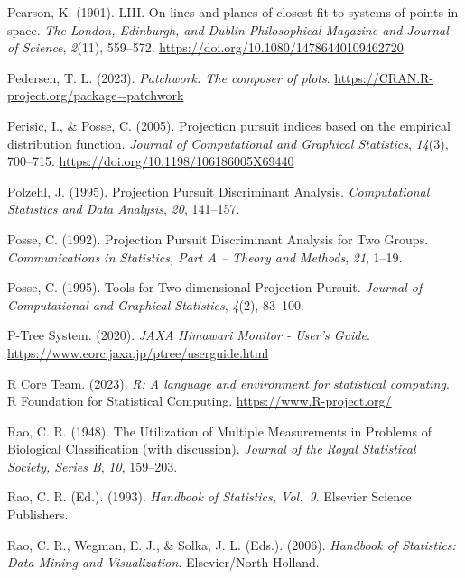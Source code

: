 \documentclass[
  letterpaper,
]{krantz}
\newlength{\cslhangindent}
\newlength{\cslentryspacingunit} %
\newenvironment{CSLReferences}[2] %
 {%
  \setlength{\parindent}{0pt}
  \ifodd #1
  \let\oldpar\par
  \def\par{\hangindent=\cslhangindent\oldpar}
  \fi
  \setlength{\parskip}{#2\cslentryspacingunit}
 }%
 {}
\begin{document}
\begin{CSLReferences}{1}{0}
\leavevmode{}%
Pearson, K. (1901). LIII. On lines and planes of closest fit to systems
of points in space. \emph{The London, Edinburgh, and Dublin
Philosophical Magazine and Journal of Science}, \emph{2}(11), 559--572.
\url{https://doi.org/10.1080/14786440109462720}

\leavevmode{}%
Pedersen, T. L. (2023). \emph{Patchwork: The composer of plots}.
\url{https://CRAN.R-project.org/package=patchwork}

\leavevmode{}%
Perisic, I., \& Posse, C. (2005). Projection pursuit indices based on
the empirical distribution function. \emph{Journal of Computational and
Graphical Statistics}, \emph{14}(3), 700--715.
\url{https://doi.org/10.1198/106186005X69440}

\leavevmode{}%
Polzehl, J. (1995). Projection {P}ursuit {D}iscriminant {A}nalysis.
\emph{Computational Statistics and Data Analysis}, \emph{20}, 141--157.

\leavevmode{}%
Posse, C. (1992). Projection {P}ursuit {D}iscriminant {A}nalysis for
{T}wo {G}roups. \emph{Communications in Statistics, Part A -- Theory and
Methods}, \emph{21}, 1--19.

\leavevmode{}%
Posse, C. (1995). Tools for {T}wo-dimensional {P}rojection {P}ursuit.
\emph{Journal of Computational and Graphical Statistics}, \emph{4}(2),
83--100.

\leavevmode{}%
P-Tree System. (2020). \emph{{JAXA Himawari Monitor - User's Guide}}.
\url{https://www.eorc.jaxa.jp/ptree/userguide.html}

\leavevmode{}%
R Core Team. (2023). \emph{R: A language and environment for statistical
computing}. R Foundation for Statistical Computing.
\url{https://www.R-project.org/}

\leavevmode{}%
Rao, C. R. (1948). The {U}tilization of {M}ultiple {M}easurements in
{P}roblems of {B}iological {C}lassification (with discussion).
\emph{Journal of the Royal Statistical Society, Series B}, \emph{10},
159--203.

\leavevmode{}%
Rao, C. R. (Ed.). (1993). \emph{{H}andbook of {S}tatistics, {V}ol.~9}.
Elsevier Science Publishers.

\leavevmode{}%
Rao, C. R., Wegman, E. J., \& Solka, J. L. (Eds.). (2006).
\emph{Handbook of {S}tatistics: {D}ata {M}ining and {V}isualization}.
Elsevier/North-Holland.


\end{CSLReferences}
\end{document}
